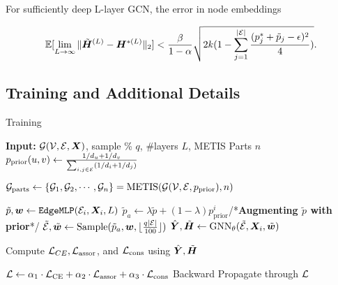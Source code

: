 \begin{theorem}
For sufficiently deep L-layer GCN, the error in node embeddings  

\vspace{-15pt}
{\scriptsize
\[
\mathbb{E}[\lim_{L \to \infty} \| {\tilde{{\bm{H}}}}^{(L)} - {\bm{H}}^{*(L)} \|_{2}] < \frac{\beta}{1-\alpha}\sqrt{2k (1 - \sum_{j=1}^{|\mathcal{E}|} \frac{(p^*_j + \tilde{p}_j - \epsilon)^2}{4})}.
\]
}
\vspace{-15pt}
\end{theorem}
% 
\subsection{\sgs Training and Additional Details}
\label{subsec:largescale}
\begin{algorithm}[!ht]
\caption{\sgs Training}
\begin{algorithmic}[1] %
\small
\STATE \textbf{Input:} ${\mathcal{G}} ({\mathcal{V}}, {\mathcal{E}}, {\bm{X}})$, sample \% $q$, \#layers $L$, METIS Parts $n$
\STATE $p_\mathrm{prior}(u,v) \gets \frac{1/d_u + 1/d_v}{\sum_{i,j\in {\mathcal{E}}} (1/d_i + 1/d_j)}$

\STATE ${\mathcal{G}}_\mathrm{parts} \gets \{{\mathcal{G}}_1,{\mathcal{G}}_2,\cdots,{\mathcal{G}}_n\}= \mathrm{METIS} ({\mathcal{G}}({\mathcal{V}},{\mathcal{E}}, p_\mathrm{prior}), n)$


        \STATE $\tilde{p}, {\bm{w}} \gets \texttt{EdgeMLP}({\mathcal{E}}_i, {\bm{X}}_i, L)$     
        \STATE $\tilde{p}_a \gets \lambda \tilde{p}+(1-\lambda)p^i_\mathrm{prior}$/*\textbf{Augmenting $\tilde{p}$ with prior}*/
        \STATE $\tilde{{\mathcal{E}}}, \tilde{{\bm{w}}} \gets \mathrm{Sample}(\tilde{p}_a, {\bm{w}}, \lfloor \frac{q|{\mathcal{E}}|}{100} \rfloor)$   
        \STATE $\hat{{\bm{Y}}}, \tilde{{\bm{H}}} \gets \mathrm{GNN}_\theta(\tilde{{\mathcal{E}}},{\bm{X}}_i,\tilde{{\bm{w}}})$ 

        \STATE Compute ${\mathcal{L}}_{CE}, {\mathcal{L}}_\mathrm{assor}$, and ${\mathcal{L}}_\mathrm{cons}$ using $\hat{{\bm{Y}}},\tilde{{\bm{H}}}$
        
        \STATE ${\mathcal{L}} \gets \alpha_1\cdot {\mathcal{L}}_\mathrm{CE}+ \alpha_2\cdot {\mathcal{L}}_\mathrm{assor}+ \alpha_3\cdot {\mathcal{L}}_\mathrm{cons}$
        \STATE Backward Propagate through ${\mathcal{L}}$
    \ENDFOR
    
\ENDFOR
\end{algorithmic}
\label{alg:sgstraining}
\end{algorithm}

